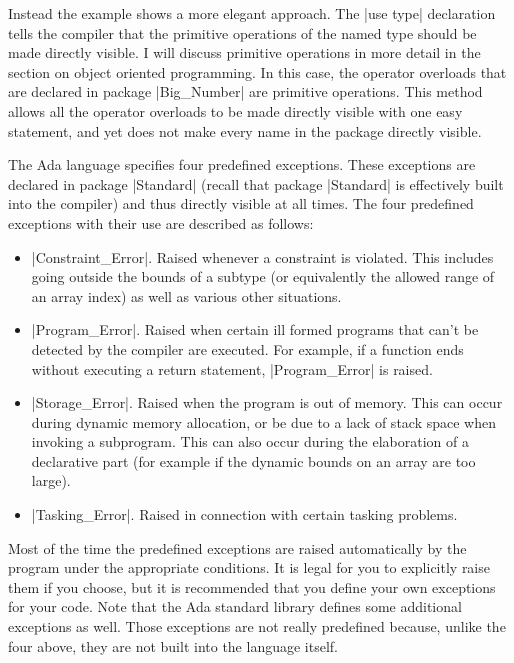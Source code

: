 Instead the example shows a more elegant approach. The |use type| declaration tells the compiler
that the primitive operations of the named type should be made directly visible. I will discuss
primitive operations in more detail in the section on object oriented programming. In this case,
the operator overloads that are declared in package |Big_Number| are primitive operations. This
method allows all the operator overloads to be made directly visible with one easy statement,
and yet does not make every name in the package directly visible.

The Ada language specifies four predefined exceptions. These exceptions are declared in package
|Standard| (recall that package |Standard| is effectively built into the compiler) and thus
directly visible at all times. The four predefined exceptions with their use are described as
follows:

\begin{itemize}

\item |Constraint_Error|. Raised whenever a constraint is violated. This includes going outside
  the bounds of a subtype (or equivalently the allowed range of an array index) as well as
  various other situations.

\item |Program_Error|. Raised when certain ill formed programs that can't be detected by the
  compiler are executed. For example, if a function ends without executing a return statement,
  |Program_Error| is raised.

\item |Storage_Error|. Raised when the program is out of memory. This can occur during dynamic
  memory allocation, or be due to a lack of stack space when invoking a subprogram. This can
  also occur during the elaboration of a declarative part (for example if the dynamic bounds
  on an array are too large).

\item |Tasking_Error|. Raised in connection with certain tasking problems.

\end{itemize}

Most of the time the predefined exceptions are raised automatically by the program under the
appropriate conditions. It is legal for you to explicitly raise them if you choose, but it is
recommended that you define your own exceptions for your code. Note that the Ada standard
library defines some additional exceptions as well. Those exceptions are not really predefined
because, unlike the four above, they are not built into the language itself.

